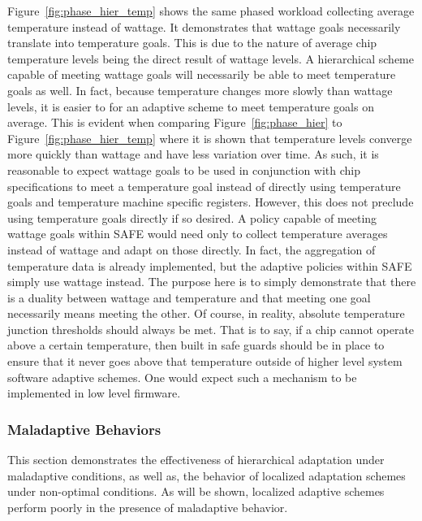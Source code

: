             Figure~\ref{fig:phase_hier_temp} shows the same phased workload collecting average temperature instead of wattage. It demonstrates that wattage goals necessarily translate into temperature goals. This is due to the nature of average chip temperature levels being the direct result of wattage levels. A hierarchical scheme capable of meeting wattage goals will necessarily be able to meet temperature goals as well. In fact, because temperature changes more slowly than wattage levels, it is easier to for an adaptive scheme to meet temperature goals on average. This is evident when comparing Figure~\ref{fig:phase_hier} to Figure~\ref{fig:phase_hier_temp} where it is shown that temperature levels converge more quickly than wattage and have less variation over time. As such, it is reasonable to expect wattage goals to be used in conjunction with chip specifications to meet a temperature goal instead of directly using temperature goals and temperature machine specific registers. However, this does not preclude using temperature goals directly if so desired. A policy capable of meeting wattage goals within SAFE would need only to collect temperature averages instead of wattage and adapt on those directly. In fact, the aggregation of temperature data is already implemented, but the adaptive policies within SAFE simply use wattage instead. The purpose here is to simply demonstrate that there is a duality between wattage and temperature and that meeting one goal necessarily means meeting the other. Of course, in reality, absolute temperature junction thresholds should always be met. That is to say, if a chip cannot operate above a certain temperature, then built in safe guards should be in place to ensure that it never goes above that temperature outside of higher level system software adaptive schemes. One would expect such a mechanism to be implemented in low level firmware. 

        \subsubsection{Maladaptive Behaviors}
            This section demonstrates the effectiveness of hierarchical adaptation under maladaptive conditions, as well as, the behavior of localized adaptation schemes under non-optimal conditions. As will be shown, localized adaptive schemes perform poorly in the presence of maladaptive behavior. 

